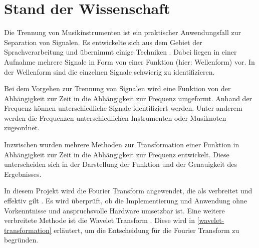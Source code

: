 \chapter{Stand der Wissenschaft}
\label{stand_der_wissenschaft}

Die Trennung von Musikinstrumenten ist ein praktischer Anwendungsfall zur Separation von Signalen. Es entwickelte sich aus dem Gebiet der Sprachverarbeitung und übernimmt einige Techniken \parencite{Mueller_2011}. Dabei liegen in einer Aufnahme mehrere Signale in Form von einer Funktion (hier: Wellenform) vor. In der Wellenform sind die einzelnen Signale schwierig zu identifizieren.

\par

Bei dem Vorgehen zur Trennung von Signalen wird eine Funktion von der Abhängigkeit zur Zeit in die Abhängigkeit zur Frequenz umgeformt. Anhand der Frequenz können unterschiedliche Signale identifiziert werden. Unter anderem werden die Frequenzen unterschiedlichen Instrumenten oder Musiknoten zugeordnet.

\par

Inzwischen wurden mehrere Methoden zur Transformation einer Funktion in Abhängigkeit zur Zeit in die Abhängigkeit zur Frequenz entwickelt. Diese unterscheiden sich in der Darstellung der Funktion und der Genauigkeit des Ergebnisses.

\par

In diesem Projekt wird die Fourier Transform angewendet, die als verbreitet und effektiv gilt \parencite{fourier_transform_importance}. Es wird überprüft, ob die Implementierung und Anwendung ohne Vorkenntnisse und anspruchsvolle Hardware umsetzbar ist. Eine weitere verbreitete Methode ist die Wavelet Transform \parencite{Guo_2022}. Diese wird in \cref{wavelet-transformation} erläutert, um die Entscheidung für die Fourier Transform zu begründen.



